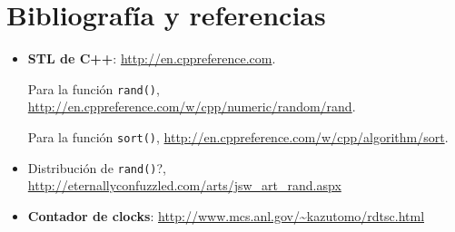 \section{Bibliografía y referencias} %

\begin{itemize}
	\item \textbf{STL de C++}: \url{http://en.cppreference.com}.
	\par Para la función \texttt{rand()}, \url{http://en.cppreference.com/w/cpp/numeric/random/rand}.
	\par Para la función \texttt{sort()}, \url{http://en.cppreference.com/w/cpp/algorithm/sort}.
	\item Distribución de \texttt{rand()}?, \url{http://eternallyconfuzzled.com/arts/jsw\_art\_rand.aspx}
	\item \textbf{Contador de clocks}: \url{http://www.mcs.anl.gov/\~kazutomo/rdtsc.html}
\end{itemize}



